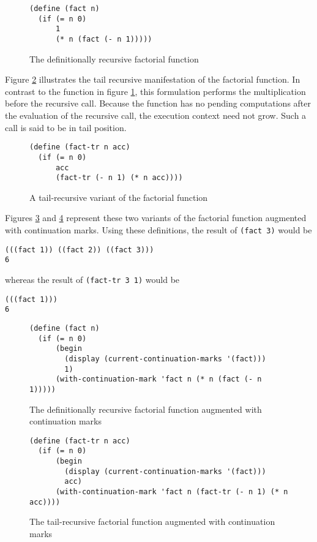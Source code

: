 \documentclass[ms,electronic,twosidetoc,letterpaper,chaptercenter,parttop]{byumsphd}
\begin{document}
\begin{figure}
\begin{verbatim}
(define (fact n)
  (if (= n 0)
      1
      (* n (fact (- n 1)))))
\end{verbatim}
\caption{The definitionally recursive factorial function}
\label{fac-rec}
\end{figure}

Figure \ref{fac-tail-rec} illustrates the tail recursive manifestation of the factorial
function. In contrast to the function in figure \ref{fac-rec}, this formulation performs
the multiplication before the recursive call. Because the function has no pending
computations after the evaluation of the recursive call, the execution context need not
grow. Such a call is said to be in tail position.

\begin{figure}
\begin{verbatim}
(define (fact-tr n acc)
  (if (= n 0)
      acc
      (fact-tr (- n 1) (* n acc))))
\end{verbatim}
\caption{A tail-recursive variant of the factorial function}
\label{fac-tail-rec}
\end{figure}

Figures \ref{fac-rec-cm} and \ref{fac-tail-rec-cm} represent these two variants of the
factorial function augmented with continuation marks. Using these definitions, the 
result of \texttt{(fact 3)} would be

\begin{verbatim}
(((fact 1)) ((fact 2)) ((fact 3)))
6
\end{verbatim}

whereas the result of \texttt{(fact-tr 3 1)} would be

\begin{verbatim}
(((fact 1)))
6
\end{verbatim}

\begin{figure}
\begin{verbatim}
(define (fact n)
  (if (= n 0)
      (begin
        (display (current-continuation-marks '(fact)))
        1)
      (with-continuation-mark 'fact n (* n (fact (- n 1)))))
\end{verbatim}
\caption{The definitionally recursive factorial function augmented with continuation marks}
\label{fac-rec-cm}
\end{figure}

\begin{figure}
\begin{verbatim}
(define (fact-tr n acc)
  (if (= n 0)
      (begin
        (display (current-continuation-marks '(fact)))
        acc)
      (with-continuation-mark 'fact n (fact-tr (- n 1) (* n acc))))
\end{verbatim}
\caption{The tail-recursive factorial function augmented with continuation marks}
\label{fac-tail-rec-cm}
\end{figure}
\end{document}
